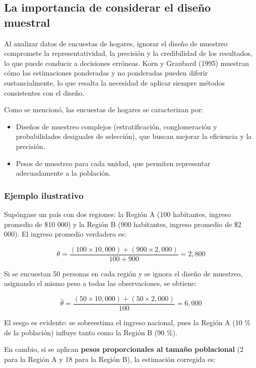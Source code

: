 \documentclass[
  spanish,
  12pt,
]{book}
\providecommand{\tightlist}{%
  \setlength{\itemsep}{0pt}\setlength{\parskip}{0pt}}
\begin{document}
\subsection{La importancia de considerar el diseño muestral}\label{la-importancia-de-considerar-el-diseuxf1o-muestral}

Al analizar datos de encuestas de hogares, ignorar el diseño de muestreo compromete la representatividad, la precisión y la credibilidad de los resultados, lo que puede conducir a decisiones erróneas. Korn y Graubard (1995) muestran cómo las estimaciones ponderadas y no ponderadas pueden diferir sustancialmente, lo que resalta la necesidad de aplicar siempre métodos consistentes con el diseño.

Como se mencionó, las encuestas de hogares se caracterizan por:

\begin{itemize}
\tightlist
\item
  Diseños de muestreo complejos (estratificación, conglomeración y probabilidades desiguales de selección), que buscan mejorar la eficiencia y la precisión.
\item
  Pesos de muestreo para cada unidad, que permiten representar adecuadamente a la población.
\end{itemize}

\subsubsection{Ejemplo ilustrativo}\label{ejemplo-ilustrativo}

Supóngase un país con dos regiones: la Región A (100 habitantes, ingreso promedio de \$10 000) y la Región B (900 habitantes, ingreso promedio de \$2 000). El ingreso promedio verdadero es:

\[
\theta = \frac{(100 \times 10,000) + (900 \times 2,000)}{100 + 900} = 2,800
\]

Si se encuestan 50 personas en cada región y se ignora el diseño de muestreo, asignando el mismo peso a todas las observaciones, se obtiene:

\[
\hat{\theta} = \frac{(50 \times 10,000) + (50 \times 2,000)}{100} = 6,000
\]

El sesgo es evidente: se sobreestima el ingreso nacional, pues la Región A (10 \% de la población) influye tanto como la Región B (90 \%).

En cambio, si se aplican \textbf{pesos proporcionales al tamaño poblacional} (2 para la Región A y 18 para la Región B), la estimación corregida es:
\end{document}
